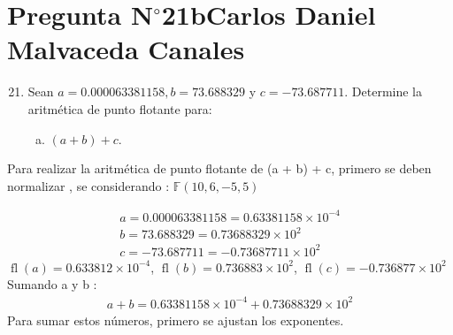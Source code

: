 \section{Pregunta N$^{\circ}$21b\qquad Carlos Daniel Malvaceda Canales}

\begin{frame}
	\begin{enumerate}\setcounter{enumi}{20}
		\item

		      Sean $a=0.000063381158, b=73.688329$ y $c=-73.687711$.
		      Determine la aritmética de punto flotante para:

		      \begin{enumerate}[b)]
			      \item

			            \begin{math}
				            \left(a+b\right)+c
			            \end{math}.
		      \end{enumerate}
	\end{enumerate}

    \begin{solution}
        Para realizar la aritmética de punto flotante de (a + b) + c, primero se deben normalizar , se considerando : 
        \begin{math}
            \mathbb{F}\left(10,6,-5,5\right)
        \end{math}
        
        \begin{align*}
            a = 0.000063381158 = 0.63381158 \times 10^{-4} \\
            b = 73.688329 = 0.73688329 \times 10^{2} \\
            c = -73.687711 = -0.73687711 \times 10^{2} 
        \end{align*}
        \begin{math}
			\operatorname{fl}\left(a\right)=
			0.633812\times 10^{-4}
		\end{math},
		\begin{math}
			\operatorname{fl}\left(b\right)=
			0.736883\times 10^{2}
		\end{math},
		\begin{math}
			\operatorname{fl}\left(c\right)=
			-0.736877\times 10^{2}
		\end{math}
        \\Sumando a y b :
        \begin{align*}
            a + b = 0.63381158 \times 10^{-4} +  0.73688329 \times 10^{2}
        \end{align*} 
        Para sumar estos números, primero se ajustan los exponentes.
        \begin{math}
        
        \end{math}
    \end{solution}
        

\end{frame}
